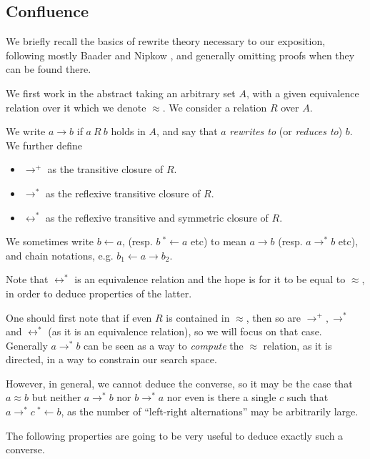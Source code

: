 \subsection{Confluence}

We briefly recall the basics of rewrite theory necessary to our exposition, following mostly Baader and Nipkow \cite{traat}, and generally omitting proofs when they can be found there.

We first work in the abstract taking an arbitrary set $A$, with a given equivalence relation over it which we denote $\approx$. We consider a relation $R$ over $A$.

\begin{definition}
  We write $a \rightarrow b$ if $a\ R\ b$ holds in $A$, and say that $a$ \emph{rewrites to} (or \emph{reduces to}) $b$. We further define
  \begin{itemize}
    \item $\rightarrow^+$ as the transitive closure of $R$.
    \item $\rightarrow^*$ as the reflexive transitive closure of $R$.
    \item $\leftrightarrow^*$ as the reflexive transitive and symmetric closure of $R$.
  \end{itemize}
  We sometimes write $b\leftarrow a$, (resp. $b\ {}^*\leftarrow a$ etc) to mean $a\rightarrow b$ (resp. $a\rightarrow^*b$ etc), and chain notations, e.g. $b_1\leftarrow a\rightarrow b_2$.
\end{definition}

Note that $\leftrightarrow^*$ is an equivalence relation and the hope is for it to be equal to $\approx$, in order to deduce properties of the latter.

One should first note that if even $R$ is contained in $\approx$, then so are $\rightarrow^+, \rightarrow^*$ and $\leftrightarrow^*$ (as it is an equivalence relation), so we will focus on that case. Generally $a \rightarrow^* b$ can be seen as a way to \emph{compute} the $\approx$ relation, as it is directed, in a way to constrain our search space.

However, in general, we cannot deduce the converse, so it may be the case that $a\approx b$ but neither $a\rightarrow^*b$ nor $b\rightarrow^*a$ nor even is there a single $c$ such that $a\rightarrow^* c\ {}^*\leftarrow b$, as the number of ``left-right alternations'' may be arbitrarily large.

The following properties are going to be very useful to deduce exactly such a converse.

